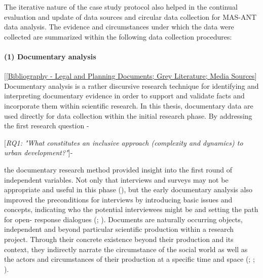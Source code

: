 \documentclass[11pt]{report}
\begin{document}
The iterative nature of the case study protocol also helped in the continual evaluation and update of data sources and circular data collection for MAS-ANT data analysis. The evidence and circumstances under which the data were collected are summarized within the following data collection procedures: 

\paragraph{(1) Documentary analysis} 
[\href{Bibliography}{[Bibliography - Legal and Planning Documents; Grey Literature; Media Sources}]
\\

Documentary analysis is a rather discursive research technique for identifying and interpreting documentary evidence in order to support and validate facts and incorporate them within scientific research. In this thesis, documentary data are used directly for data collection within the initial research phase. By addressing the first research question -

[\textit{RQ1: "What constitutes an inclusive approach (complexity and dynamics) to urban development?"}]-

the documentary research method provided insight into the first round of independent variables.
Not only that interviews and surveys may not be appropriate and useful in this phase (\href{Mogalakwe}{\citealt{mogalakwe_use_2006}}), but the early documentary analysis also improved the preconditions for interviews by introducing basic issues and concepts, indicating who the potential interviewees might be and setting the path for open- response dialogues (\href{Robson}{\citealt{robson_real_1993}}; \href{Grubovic}{\citealt{grubovic_belgrade_2006}}).
Documents are naturally occurring objects, independent and beyond particular scientific production within a research project. Through their concrete existence beyond their production and its context, they indirectly narrate the circumstance of the social world as well as the actors and circumstances of their production at a specific time and space (\href{Jary}{\citealt{jary_harpercollins_1991}}; \href{Payne}{\citealt{payne_key_2004}}; \href{Mogalakwe}{\citealt{mogalakwe_use_2006}}).
\\
\end{document}
